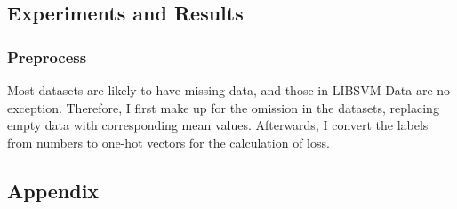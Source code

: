 \documentclass[12pt,a4paper]{article}
\theoremstyle{definition}
\begin{document}
\subsection{Experiments and Results}

\subsubsection{Preprocess}

Most datasets are likely to have missing data, and those in LIBSVM Data are no exception. Therefore, I first make up for the omission in the datasets, replacing empty data with corresponding mean values. Afterwards, I convert the labels from numbers to one-hot vectors for the calculation of loss.

\newpage
\begin{appendix}
\section{Appendix}



\end{appendix}



\end{document}
